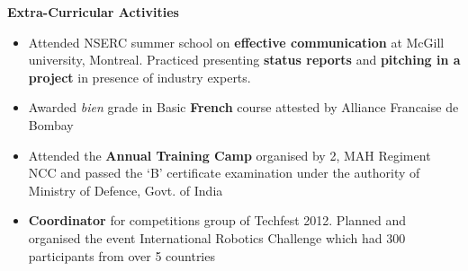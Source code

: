 \documentclass[a4paper,10pt]{article}
\newcommand{\resheading}[1]{
	{\large \colorbox{mygrey}{\begin{minipage}{\textwidth}{\textbf{#1 \vphantom{p\^{E}}}}\end{minipage}}}
}
\begin{document}
\resheading{Extra-Curricular Activities}
	\begin{itemize}[label={--}]\itemsep -1pt
		\item Attended NSERC summer school on \textbf{effective communication} at McGill university, Montreal. Practiced presenting \textbf{status reports} and \textbf{pitching in a project} in presence of industry experts.
		\item Awarded \textit{bien} grade in Basic \textbf{French} course attested by Alliance Francaise de Bombay
		\item Attended the \textbf{Annual Training Camp} organised by 2, MAH Regiment NCC and passed the ‘B’ certificate examination under the authority of Ministry of Defence, Govt. of India
		\item \textbf{Coordinator} for competitions group of Techfest 2012. Planned and organised the event International Robotics Challenge which had 300 participants from over 5 countries
	\end{itemize}
\end{document}
